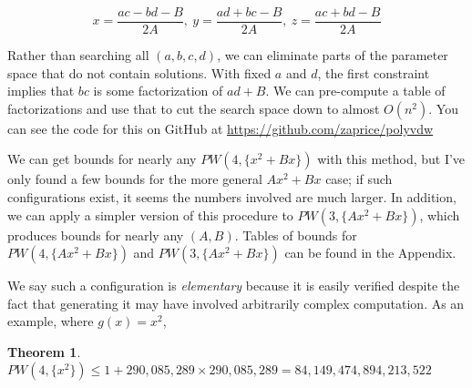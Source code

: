 \documentclass[a4paper]{amsproc}
\theoremstyle{plain}
\newtheorem{thm}{Theorem}[section]
\theoremstyle{named}
\begin{document}
$$x = \frac{ac-bd-B}{2A},\ y = \frac{ad+bc-B}{2A},\ z = \frac{ac+bd-B}{2A}$$

Rather than searching all $(a,b,c,d)$, we can eliminate parts of the parameter space that do not contain solutions.
With fixed $a$ and $d$, the first constraint implies that $bc$ is some factorization of $ad + B$.
We can pre-compute a table of factorizations and use that to cut the search space down to almost $O(n^2)$.
You can see the code for this on GitHub at \url{https://github.com/zaprice/polyvdw}

We can get bounds for nearly any $PW(4,\{x^2+Bx\})$ with this method,
but I've only found a few bounds for the more general $Ax^2+Bx$ case;
if such configurations exist, it seems the numbers involved are much larger.
In addition, we can apply a simpler version of this procedure to $PW(3,\{Ax^2+Bx\})$,
which produces bounds for nearly any $(A, B)$.
Tables of bounds for $PW(4,\{Ax^2+Bx\})$ and $PW(3,\{Ax^2+Bx\})$ can be found in the Appendix.

We say such a configuration is \textit{elementary} because it is easily verified despite the fact that generating it may have involved arbitrarily complex computation.
As an example, where $g(x)=x^2$,

\begin{thm}
$ PW(4, \{x^2\}) \leq 1+290{,}085{,}289\times 290{,}085{,}289 = 84{,}149{,}474{,}894{,}213{,}522$
\end{thm}
\end{document}
